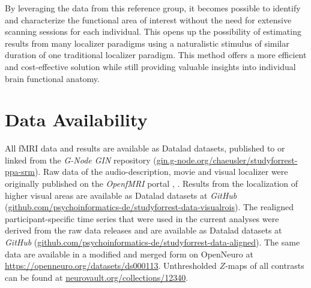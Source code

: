 %
By leveraging the data from this reference group, it becomes possible to
identify and characterize the functional area of interest without the need for
extensive scanning sessions for each individual.
%
This opens up the possibility of estimating results from many localizer
paradigms using a naturalistic stimulus of similar duration of one traditional
localizer paradigm.
%
This method offers a more efficient and cost-effective solution while still
providing valuable insights into individual brain functional anatomy.

\normalsize



\section{Data Availability}



All fMRI data and results are available as Datalad \citep{halchenko2021datalad}
datasets, published to or linked from the \emph{G-Node GIN} repository
(\href{https://gin.g-node.org/chaeusler/studyforrest-ppa-srm}{\url{gin.g-node.org/chaeusler/studyforrest-ppa-srm}}).
Raw data of the audio-description, movie and visual localizer were originally
published on the \emph{OpenfMRI} portal
\citep[\url{https://legacy.openfmri.org/dataset/ds000113}][]
{Hanke2014ds000113}, \space
\citep[\url{https://legacy.openfmri.org/dataset/ds000113d}][]
{hanke2016ds000113d}.
Results from the localization of higher visual areas are available as Datalad
datasets at \emph{GitHub}
(\href{https://github.com/psychoinformatics-de/studyforrest-data-visualrois}{\url{github.com/psychoinformatics-de/studyforrest-data-visualrois}}).
The realigned participant-specific time series that were used in the current
analyses were derived from the raw data releases and are available as Datalad
datasets at \emph{GitHub}
(\href{https://github.com/psychoinformatics-de/studyforrest-data-aligned}{\url{github.com/psychoinformatics-de/studyforrest-data-aligned}}).
The same data are available in a modified and merged form on OpenNeuro at
\url{https://openneuro.org/datasets/ds000113}.
Unthresholded $Z$-maps of all contrasts can be found at
\href{https://identifiers.org/neurovault.collection:12340}{\url{neurovault.org/collections/12340}}.


